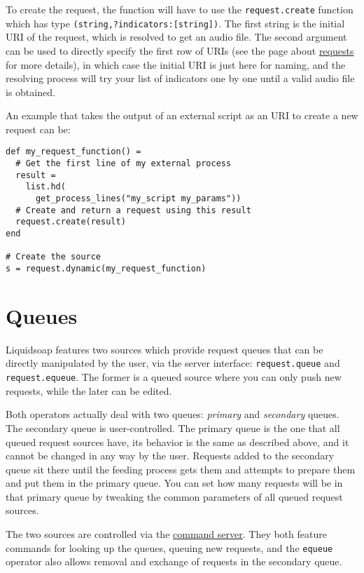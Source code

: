 To create the request, the function will have 
to use the \verb+request.create+ function which has type
\verb+(string,?indicators:[string])+.
The first string is the initial URI of the request, 
which is resolved to get an audio file.
The second argument can be used to directly specify the first row of URIs
(see the page about \href{requests.html}{requests} for more details),
in which case the initial URI is just here for naming,
and the resolving process will try your list of indicators one by one
until a valid audio file is obtained.

An example that takes the output of an external script as an URI
to create a new request can be:

\begin{verbatim}
def my_request_function() = 
  # Get the first line of my external process
  result =
    list.hd(
      get_process_lines("my_script my_params"))
  # Create and return a request using this result
  request.create(result)
end

# Create the source
s = request.dynamic(my_request_function)
\end{verbatim}
\section{Queues}
Liquidsoap features two sources which provide request queues that
can be directly manipulated by the user, via the server interface:
\verb+request.queue+ and \verb+request.equeue+.
The former is a queued source where you can only push new requests,
while the later can be edited.

Both operators actually deal with two queues: \emph{primary} and \emph{secondary} queues.
The secondary queue is user-controlled.
The primary queue is the one that all queued request sources have,
its behavior is the same as described above, and it cannot be changed
in any way by the user.
Requests added to the secondary queue sit there until
the feeding process gets them and attempts to prepare them
and put them in the primary queue.
You can set how many requests will be in that primary queue
by tweaking the common parameters of all queued request sources.

The two sources are controlled via the \href{advanced.html}{command server}.
They both feature commands for looking up the queues,
queuing new requests, and the \verb+equeue+ operator also allows
removal and exchange of requests in the secondary queue.

